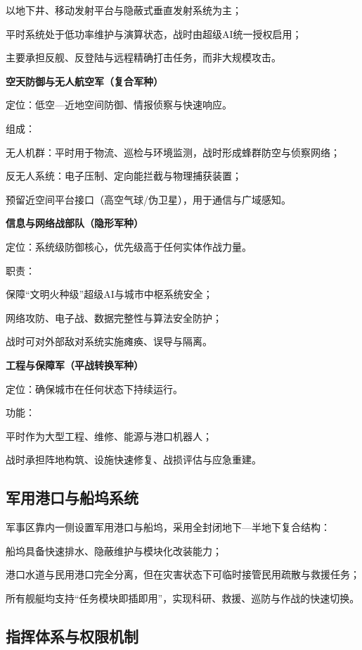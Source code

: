 以地下井、移动发射平台与隐蔽式垂直发射系统为主；

平时系统处于低功率维护与演算状态，战时由超级AI统一授权启用；

主要承担反舰、反登陆与远程精确打击任务，而非大规模攻击。

\textbf{空天防御与无人航空军（复合军种）}

定位：低空---近地空间防御、情报侦察与快速响应。

组成：

无人机群：平时用于物流、巡检与环境监测，战时形成蜂群防空与侦察网络；

反无人系统：电子压制、定向能拦截与物理捕获装置；

预留近空间平台接口（高空气球/伪卫星），用于通信与广域感知。

\textbf{信息与网络战部队（隐形军种）}

定位：系统级防御核心，优先级高于任何实体作战力量。

职责：

保障``文明火种级''超级AI与城市中枢系统安全；

网络攻防、电子战、数据完整性与算法安全防护；

战时可对外部敌对系统实施瘫痪、误导与隔离。

\textbf{工程与保障军（平战转换军种）}

定位：确保城市在任何状态下持续运行。

功能：

平时作为大型工程、维修、能源与港口机器人；

战时承担阵地构筑、设施快速修复、战损评估与应急重建。

\subsection{军用港口与船坞系统}\label{ux519bux7528ux6e2fux53e3ux4e0eux8239ux575eux7cfbux7edf}

军事区靠内一侧设置军用港口与船坞，采用全封闭地下---半地下复合结构：

船坞具备快速排水、隐蔽维护与模块化改装能力；

港口水道与民用港口完全分离，但在灾害状态下可临时接管民用疏散与救援任务；

所有舰艇均支持``任务模块即插即用''，实现科研、救援、巡防与作战的快速切换。

\subsection{指挥体系与权限机制}\label{ux6307ux6325ux4f53ux7cfbux4e0eux6743ux9650ux673aux5236}

